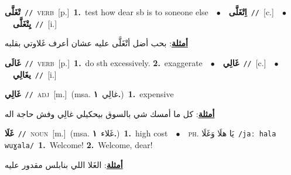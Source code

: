 \documentclass[10pt,a4paper,twoside]{article} %
\begin{document}
\begin{multicols}{2}
{\setlength\topsep{0pt}\textbf{\foreignlanguage{arabic}{تْغَلَّى}}\ {\color{gray}\texttt{//}\color{black}}\ \textsc{verb}\ [p.]\ \textbf{1.}~test how dear sb is to soneone else\ \ $\bullet$\ \ \setlength\topsep{0pt}\textbf{\foreignlanguage{arabic}{اِتْغَلَّى}}\ {\color{gray}\texttt{//}\color{black}}\ [c.]\ \ $\bullet$\ \ \setlength\topsep{0pt}\textbf{\foreignlanguage{arabic}{يِتْغَلَّى}}\ {\color{gray}\texttt{//}\color{black}}\ [i.]\  \begin{flushright}\color{gray}\foreignlanguage{arabic}{\textbf{\underline{\foreignlanguage{arabic}{أمثلة}}}: بحب أضل أتْغَلَّى عليه عشان أعرف غَلاوتي بقلبه}\end{flushright}\color{black}} \vspace{2mm}

{\setlength\topsep{0pt}\textbf{\foreignlanguage{arabic}{غَالَى}}\ {\color{gray}\texttt{//}\color{black}}\ \textsc{verb}\ [p.]\ \textbf{1.}~do sth  excessively.  \textbf{2.}~exaggerate\ \ $\bullet$\ \ \setlength\topsep{0pt}\textbf{\foreignlanguage{arabic}{غَالِي}}\ {\color{gray}\texttt{//}\color{black}}\ [c.]\ \ $\bullet$\ \ \setlength\topsep{0pt}\textbf{\foreignlanguage{arabic}{يغَالِي}}\ {\color{gray}\texttt{//}\color{black}}\ [i.]\ } \vspace{2mm}

{\setlength\topsep{0pt}\textbf{\foreignlanguage{arabic}{غَالِي}}\ {\color{gray}\texttt{//}\color{black}}\ \textsc{adj}\ [m.]\ \color{gray}(msa. \foreignlanguage{arabic}{غالِي}~\foreignlanguage{arabic}{\textbf{١.}})\color{black}\ \textbf{1.}~expensive\  \begin{flushright}\color{gray}\foreignlanguage{arabic}{\textbf{\underline{\foreignlanguage{arabic}{أمثلة}}}: كل ما أمسك شي بالسوق بيحكيلي غالِي وفش حاجة اله}\end{flushright}\color{black}} \vspace{2mm}

{\setlength\topsep{0pt}\textbf{\foreignlanguage{arabic}{غَلَا}}\ {\color{gray}\texttt{//}\color{black}}\ \textsc{noun}\ [m.]\ \color{gray}(msa. \foreignlanguage{arabic}{غَلاء}~\foreignlanguage{arabic}{\textbf{١.}})\color{black}\ \textbf{1.}~high cost\ \ $\bullet$\ \ \textsc{ph.} \color{gray} \foreignlanguage{arabic}{يَا هلَا وَغَلَا}\color{black}\ {\color{gray}\texttt{/{\sffamily jaː hala wuɣala}/}\color{black}}\ \textbf{1.}~Welcome!  \textbf{2.}~Welcome, dear!\  \begin{flushright}\color{gray}\foreignlanguage{arabic}{\textbf{\underline{\foreignlanguage{arabic}{أمثلة}}}: الغَلا اللي بنابلس مقدور عليه}\end{flushright}\color{black}} \vspace{2mm}


\end{multicols}
\end{document}
